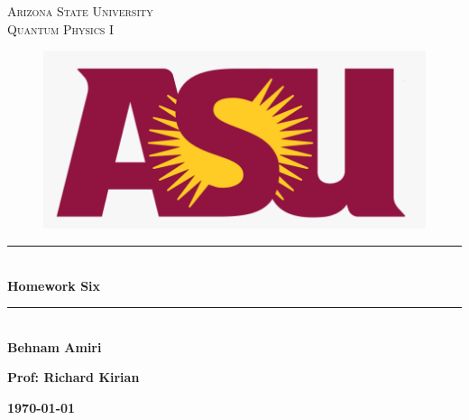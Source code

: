 \documentclass[fleqn]{article}
\begin{document}
  \begin{titlepage}

    \newcommand{\HRule}{\rule{\linewidth}{0.5mm}}

    \center


    \textsc{\LARGE Arizona State University}\\[1.5cm]

    \textsc{\LARGE Quantum Physics I }\\[1.5cm]


    \begin{figure}
      \includegraphics[width=\linewidth]{asu.png}
    \end{figure}


    \HRule \\[0.4cm]
    { \huge \bfseries Homework Six}\\[0.4cm] 
    \HRule \\[1.5cm]

    \textbf{Behnam Amiri}

    \bigbreak

    \textbf{Prof: Richard Kirian}

    \bigbreak

    \textbf{{\large \today}\\[2cm]}

    \vfill 

  \end{titlepage}
\end{document}
